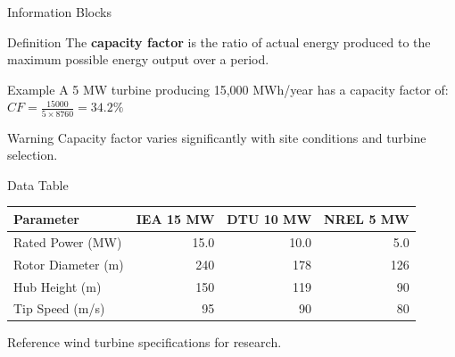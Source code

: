 \begin{frame}{Information Blocks}
    \begin{block}{Definition}
        The \textbf{capacity factor} is the ratio of actual energy produced to the maximum possible energy output over a period.
    \end{block}

    \begin{exampleblock}{Example}
        A 5 MW turbine producing 15,000 MWh/year has a capacity factor of:
        $CF = \frac{15000}{5 \times 8760} = 34.2\%$
    \end{exampleblock}

    \begin{alertblock}{Warning}
        Capacity factor varies significantly with site conditions and turbine selection.
    \end{alertblock}
\end{frame}

\begin{frame}{Data Table}
    \centering
    \begin{tabular}{lrrr}
        \toprule
        \textbf{Parameter} & \textbf{IEA 15 MW} & \textbf{DTU 10 MW} & \textbf{NREL 5 MW} \\
        \midrule
        Rated Power (MW)    & 15.0  & 10.0  & 5.0   \\
        Rotor Diameter (m)  & 240   & 178   & 126   \\
        Hub Height (m)      & 150   & 119   & 90    \\
        Tip Speed (m/s)     & 95    & 90    & 80    \\
        \bottomrule
    \end{tabular}

    \vspace{0.5cm}
    {\small Reference wind turbine specifications for research.}
\end{frame}

